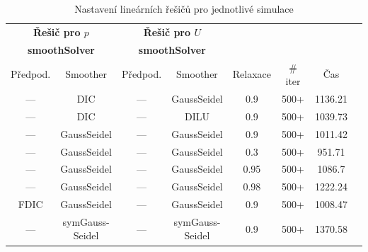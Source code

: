 \documentclass[a4paper,12pt]{report}
\theoremstyle{remark}
\begin{document}
\begin{table}[H]
	\centering
	\caption{Nastavení lineárních řešičů pro jednotlivé simulace}
	\renewcommand{\arraystretch}{1.9}
	\begin{tabular}{*8c}
		\toprule
		
		\multicolumn{2}{c}{\textbf{Řešič pro $p$}} & \multicolumn{2}{c}{\textbf{Řešič pro $U$}}\\
		\multicolumn{2}{c}{\textbf{smoothSolver}} & \multicolumn{2}{c}{\textbf{smoothSolver}}\\		
		\midrule
		Předpod.&Smoother&Předpod.&Smoother&Relaxace& \# iter&Čas\\
		\midrule
		
		
		
		--- & DIC &  --- & GaussSeidel &0.9&500+&1136.21\\	
		
		--- & DIC & --- & DILU &0.9&500+&1039.73\\
		
		--- & GaussSeidel &   --- & GaussSeidel &0.9&500+&1011.42\\
		
		--- & GaussSeidel &  --- & GaussSeidel &0.3&500+&951.71\\
		
		--- & GaussSeidel &   --- & GaussSeidel &0.95&500+&1086.7\\
		
		--- & GaussSeidel &  --- & GaussSeidel &0.98&500+&1222.24\\
		
		FDIC & GaussSeidel &  --- & GaussSeidel &0.9&500+&1008.47\\
		
		--- & \shortstack{symGauss-\\Seidel} &  --- & \shortstack{symGauss-\\Seidel} &0.9&500+&1370.58\\	
		\bottomrule
	\end{tabular}
	
	\label{table:solvers_set3}
\end{table}
\end{document}
